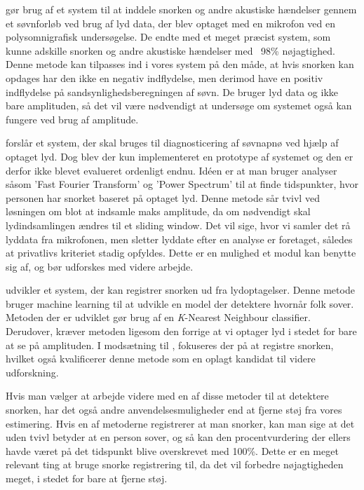 \citet{Dafna2013} gør brug af et system til at inddele snorken og andre akustiske hændelser gennem et søvnforløb ved brug af lyd data, der blev optaget med en mikrofon ved en polysomnigrafisk undersøgelse. 
De endte med et meget præcist system, som kunne adskille snorken og andre akustiske hændelser med ~98\% nøjagtighed.
Denne metode kan tilpasses ind i vores system på den måde, at hvis snorken kan opdages har den ikke en negativ indflydelse, men derimod have en positiv indflydelse på sandsynlighedsberegningen af søvn. 
De bruger lyd data og ikke bare amplituden, så det vil være nødvendigt at undersøge om systemet også kan fungere ved brug af amplitude.

\citet{Calabrese20111101} forslår et system, der skal bruges til diagnosticering af søvnapnø ved hjælp af optaget lyd.
Dog blev der kun implementeret en prototype af systemet og den er derfor ikke blevet evalueret ordenligt endnu. 
Idéen er at man bruger analyser såsom 'Fast Fourier Transform' og 'Power Spectrum' til at finde tidspunkter, hvor personen har snorket baseret på optaget lyd. 
Denne metode sår tvivl ved løsningen om blot at indsamle maks amplitude, da om nødvendigt skal lydindsamlingen ændres til et sliding window.
Det vil sige, hvor vi samler det rå lyddata fra mikrofonen, men sletter lyddate efter en analyse er foretaget, således at privatlivs kriteriet stadig opfyldes.
Dette er en mulighed et modul kan benytte sig af, og bør udforskes med videre arbejde.

\citet{7051338} udvikler et system, der kan registrer snorken ud fra lydoptagelser.
Denne metode bruger machine learning til at udvikle en model der detektere hvornår folk sover.
Metoden der er udviklet gør brug af en \textit{K}-Nearest Neighbour classifier.
Derudover, kræver metoden ligesom den forrige at vi optager lyd i stedet for bare at se på amplituden.
I modsætning til \citet{Calabrese20111101}, fokuseres der på at registre snorken, hvilket også kvalificerer denne metode som en oplagt kandidat til videre udforskning.

Hvis man vælger at arbejde videre med en af disse metoder til at detektere snorken, har det også andre anvendelsesmuligheder end at fjerne støj fra vores estimering.
Hvis en af metoderne registrerer at man snorker, kan man sige at det uden tvivl betyder at en person sover, og så kan den procentvurdering der ellers havde været på det tidspunkt blive overskrevet med 100\%.
Dette er en meget relevant ting at bruge snorke registrering til, da det vil forbedre nøjagtigheden meget, i stedet for bare at fjerne støj.
